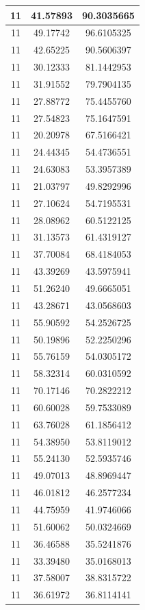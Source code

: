 \documentclass[
]{book}
\begin{document}
\begin{tabular}{c|c|c}
\hline
11 & 41.57893 & 90.3035665\\
\hline
11 & 49.17742 & 96.6105325\\
\hline
11 & 42.65225 & 90.5606397\\
\hline
11 & 30.12333 & 81.1442953\\
\hline
11 & 31.91552 & 79.7904135\\
\hline
11 & 27.88772 & 75.4455760\\
\hline
11 & 27.54823 & 75.1647591\\
\hline
11 & 20.20978 & 67.5166421\\
\hline
11 & 24.44345 & 54.4736551\\
\hline
11 & 24.63083 & 53.3957389\\
\hline
11 & 21.03797 & 49.8292996\\
\hline
11 & 27.10624 & 54.7195531\\
\hline
11 & 28.08962 & 60.5122125\\
\hline
11 & 31.13573 & 61.4319127\\
\hline
11 & 37.70084 & 68.4184053\\
\hline
11 & 43.39269 & 43.5975941\\
\hline
11 & 51.26240 & 49.6665051\\
\hline
11 & 43.28671 & 43.0568603\\
\hline
11 & 55.90592 & 54.2526725\\
\hline
11 & 50.19896 & 52.2250296\\
\hline
11 & 55.76159 & 54.0305172\\
\hline
11 & 58.32314 & 60.0310592\\
\hline
11 & 70.17146 & 70.2822212\\
\hline
11 & 60.60028 & 59.7533089\\
\hline
11 & 63.76028 & 61.1856412\\
\hline
11 & 54.38950 & 53.8119012\\
\hline
11 & 55.24130 & 52.5935746\\
\hline
11 & 49.07013 & 48.8969447\\
\hline
11 & 46.01812 & 46.2577234\\
\hline
11 & 44.75959 & 41.9746066\\
\hline
11 & 51.60062 & 50.0324669\\
\hline
11 & 36.46588 & 35.5241876\\
\hline
11 & 33.39480 & 35.0168013\\
\hline
11 & 37.58007 & 38.8315722\\
\hline
11 & 36.61972 & 36.8114141\\

\end{tabular}
\end{document}
